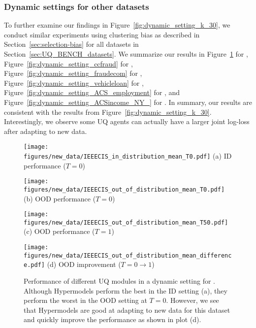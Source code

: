 \subsubsection{Dynamic settings for   other datasets}


To further examine our findings in Figure~\ref{fig:dynamic_setting_k_30}, we conduct similar experiments using clustering bias as described in Section~\ref{sec:selection-bias} for all datasets in Section~\ref{sec:UQ_BENCH_datasets}.
We summarize our results in Figure~\ref{fig:dynamic_setting_IEEECIS}
for \ieeecis, Figure~\ref{fig:dynamic_setting_ccfraud}
for \ccfraud, Figure~\ref{fig:dynamic_setting_fraudecom}
for \fraudecom,  Figure~\ref{fig:dynamic_setting_vehicleloan}
for \vehicleloan,  Figure~\ref{fig:dynamic_setting_ACS_employment}
for \acsemployment, and 
Figure~\ref{fig:dynamic_setting_ACSincome_NY_}
for \acsincome. 
In summary, our results are consistent with the results from Figure~\ref{fig:dynamic_setting_k_30}. 
Interestingly, we observe some UQ agents can actually have a larger joint log-loss after adapting to new data.
 





\begin{figure}[h]
\centering
\begin{minipage}[b]{0.24\textwidth}
\centering
\texttt{[image: figures/new\_data/IEEECIS\_in\_distribution\_mean\_T0.pdf]}
{\small{{(a)} ID performance ($T=0$) }}
\end{minipage}
\hfill
\begin{minipage}[b]{0.24\textwidth}
\centering \texttt{[image: figures/new\_data/IEEECIS\_out\_of\_distribution\_mean\_T0.pdf]}
{\small{{(b)} OOD performance ($T=0$) }}
\end{minipage}
\hfill
\begin{minipage}[b]{0.24\textwidth}
\centering \texttt{[image: figures/new\_data/IEEECIS\_out\_of\_distribution\_mean\_T50.pdf]}
{\small{{(c)} OOD performance ($T=1$) }}
\end{minipage}
\hfill
\begin{minipage}[b]{0.24\textwidth}
\centering \texttt{[image: figures/new\_data/IEEECIS\_out\_of\_distribution\_mean\_difference.pdf]}
{\small{{(d)} OOD improvement ($T=0 \to 1$) }} \end{minipage}
\caption{Performance of different UQ modules in a dynamic setting for \ieeecis.
Although Hypermodels perform the best in the ID setting (a), they perform the worst in the OOD setting at $T=0$. However, we see that Hypermodels are good at adapting to new data for this dataset and quickly improve the performance as shown in plot (d).
}
\label{fig:dynamic_setting_IEEECIS}
\end{figure}


